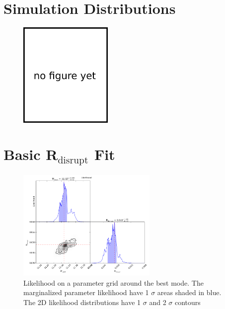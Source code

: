 \documentclass[twocolumn]{article}
\begin{document}
\clearpage

\section{Simulation Distributions}

\begin{figure}[H]
  \center\includegraphics[width=0.4\textwidth]{figs/404.png}
  \caption{}
  \label{fig:simulation_mass_redshift}
\end{figure}

\clearpage


\section{Basic R$_{\mathrm{disrupt}}$ Fit}

\begin{figure}[H]
  \center\includegraphics[width=0.6\textwidth]{figs/cfn/basic_rd.param/calc_likelihood_bounds.py/fig1.png}
  \caption{Likelihood on a parameter grid around the best mode. The marginalized parameter likelihood have
    1 $\sigma$ areas shaded in blue. The 2D likelihood distributions have 1 $\sigma$  and 2 $\sigma$ contours}
  \label{fig:basic_rd:likelihood}
\end{figure}
\end{document}
